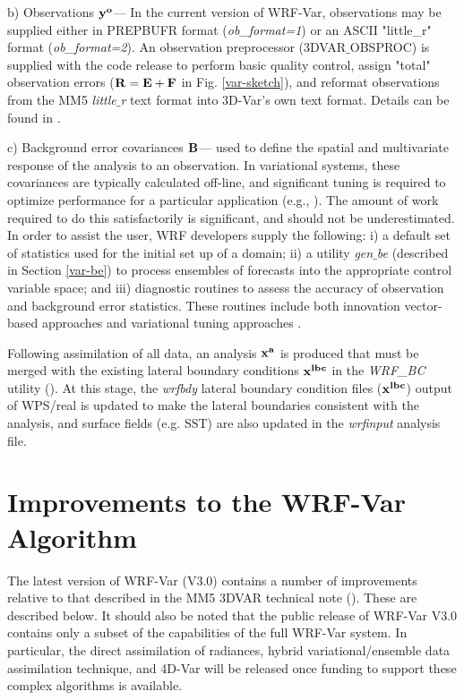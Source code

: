 \vspace{0.5cm}

b) Observations ${\bf y^{o}}$--- In the current version of WRF-Var, observations may be 
supplied either in PREPBUFR format ({\it ob\_format=1}) or an ASCII "little\_r" format
({\it ob\_format=2}). An observation preprocessor (3DVAR$\_$OBSPROC) 
is supplied with the code release to perform basic quality control, assign "total" 
observation errors (${\bf R = E+F}$ in Fig. \ref{var-sketch}), and reformat observations from the MM5 {\it little$\_$r} text 
format into 3D-Var's own text format. Details can be found in \citet{barker03, barker04}.

\vspace{0.5cm}

c) Background error covariances ${\bf B}$--- used to define the spatial
and multivariate response of the analysis to an observation. In
variational systems, these covariances are typically calculated
off-line, and significant tuning is required to optimize performance
for a particular application (e.g., \citet{ingleby01, wu02}). The
amount of work required to do this satisfactorily is significant, and
should not be underestimated. In order to assist the user, WRF
developers supply the following: i) a default set of statistics used
for the initial set up of a domain; ii) a utility {\it gen$\_$be}
(described in Section
\ref{var-be}) to process ensembles of forecasts into the appropriate control variable 
space; and iii) diagnostic routines to assess the accuracy of
observation and background error statistics. These routines include
both innovation vector-based approaches \citep{hollingsworth86} and
variational tuning approaches \citep{desroziers01}.

Following assimilation of all data, an analysis ${\bf x^{a}}$ is produced that must be 
merged with the existing lateral boundary conditions ${\bf x^{lbc}}$ in the {\it WRF\_BC} 
utility (\citet{barker03}). At this stage, the {\it wrfbdy} lateral boundary condition 
files (${\bf x^{lbc}}$) output of WPS/real is updated to make the lateral boundaries consistent with the analysis, and surface fields (e.g. SST) are also updated in the {\it wrfinput} analysis file.

\section{Improvements to the WRF-Var Algorithm}
\label{var-upgrade}

The latest version of WRF-Var (V3.0) contains a number of improvements relative
to that described in the MM5 3DVAR technical note (\citet{barker03}). These are described below.
It should also be noted that the public release of WRF-Var V3.0 contains only a subset of
the capabilities of the full WRF-Var system. In particular, the direct assimilation of radiances, 
hybrid variational/ensemble data assimilation technique, and 4D-Var will be released once
funding to support these complex algorithms is available.

